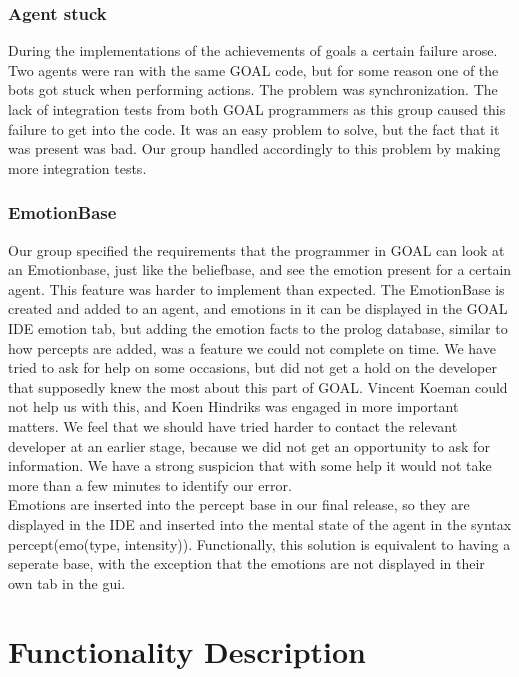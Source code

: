 \documentclass[11pt]{article}
\begin{document}
\subsubsection*{Agent stuck}
During the implementations of the achievements of goals a certain failure arose. Two agents were ran with the same GOAL code, but for some reason one of the bots got stuck when performing actions. The problem was synchronization. The lack of integration tests from both GOAL programmers as this group caused this failure to get into the code. It was an easy problem to solve, but the fact that it was present was bad. Our group handled accordingly to this problem by making more integration tests. 

\subsubsection*{EmotionBase}
Our group specified the requirements that the programmer in GOAL can look at an Emotionbase, just like the beliefbase, and see the emotion present for a certain agent. This feature was harder to implement than expected. The EmotionBase is created and added to an agent, and emotions in it can be displayed in the GOAL IDE emotion tab, but adding the emotion facts to the prolog database, similar to how percepts are added, was a feature we could not complete on time. We have tried to ask for help on some occasions, but did not get a hold on the developer that supposedly knew the most about this part of GOAL. Vincent Koeman could not help us with this, and Koen Hindriks was engaged in more important matters. We feel that we should have tried harder to contact the relevant developer at an earlier stage, because we did not get an opportunity to ask for information. We have a strong suspicion that with some help it would not take more than a few minutes to identify our error.\\
Emotions are inserted into the percept base in our final release, so they are displayed in the IDE and inserted into the mental state of the agent in the syntax percept(emo(type, intensity)). Functionally, this solution is equivalent to having a seperate base, with the exception that the emotions are not displayed in their own tab in the gui. 


\section{Functionality Description}
\end{document}
